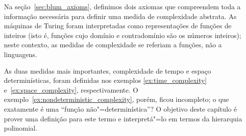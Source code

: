 Na seção~\ref{sec:blum_axioms},
definimos dois axiomas que compreendem toda a informação necessária
para definir uma medida de complexidade abstrata.
As máquinas de Turing foram interpretadas como
representações de funções de inteiros
(isto é, funções cujo domínio e contradomínio são os números inteiros);
neste contexto,
as medidas de complexidade
se referiam a funções, não a linguagens.

As duas medidas mais importantes,
complexidade de tempo e espaço determinísticas,
foram definidas nos exemplos
\ref{ex:time_complexity} e~\ref{ex:space_complexity},
respectivamente.
O exemplo~\ref{ex:nondeterministic_complexity},
porém,
ficou incompleto;
o que exatamente é uma ``função não"=determinística''?
O objetivo deste capítulo é prover uma definição para este termo
e interpretá"=lo em termos da hierarquia polinomial.
